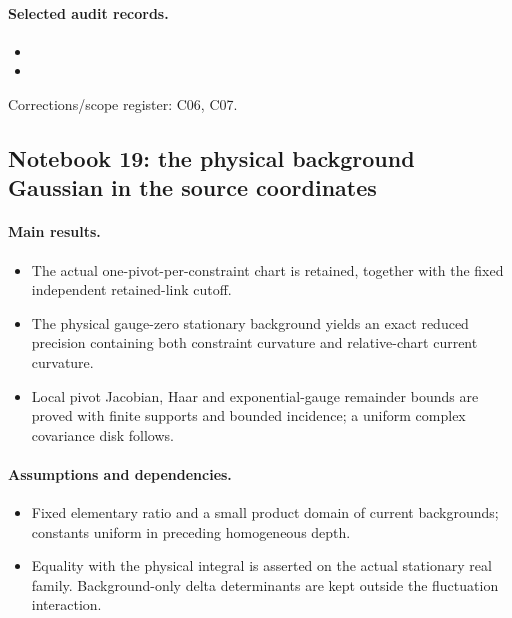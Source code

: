 \documentclass[11pt]{article}
\theoremstyle{remark}
\begin{document}
\paragraph{Selected audit records.}
\begingroup\small
\begin{itemize}
\item {}
\item {}
\end{itemize}
\endgroup
Corrections/scope register: C06, C07.\par

\subsection{Notebook 19: the physical background Gaussian in the source coordinates}
\label{hnc-19}
\noindent{}\par

\paragraph{Main results.}
\begin{itemize}
\item The actual one-pivot-per-constraint chart is retained, together with the fixed independent retained-link cutoff.
\item The physical gauge-zero stationary background yields an exact reduced precision containing both constraint curvature and relative-chart current curvature.
\item Local pivot Jacobian, Haar and exponential-gauge remainder bounds are proved with finite supports and bounded incidence; a uniform complex covariance disk follows.
\end{itemize}

\paragraph{Assumptions and dependencies.}
\begin{itemize}
\item Fixed elementary ratio and a small product domain of current backgrounds; constants uniform in preceding homogeneous depth.
\item Equality with the physical integral is asserted on the actual stationary real family. Background-only delta determinants are kept outside the fluctuation interaction.
\end{itemize}
\end{document}
